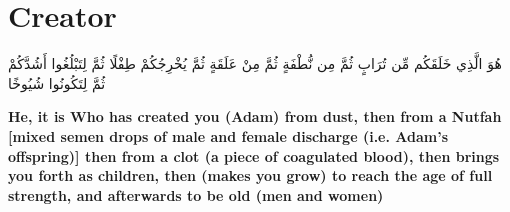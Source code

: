 \chapter{Creator}
\begin{center}
    {\Huge    
        \begin{Arabic}
            هُوَ الَّذِي خَلَقَكُم مِّن تُرَابٍ ثُمَّ مِن نُّطْفَةٍ ثُمَّ مِنْ عَلَقَةٍ ثُمَّ يُخْرِجُكُمْ طِفْلًا ثُمَّ لِتَبْلُغُوا أَشُدَّكُمْ ثُمَّ لِتَكُونُوا شُيُوخًا
        \end{Arabic}
    }
\end{center}
\vspace*{\fill}
\vspace{3cm}
\begin{center}
    \large \textbf{He, it is Who has created you (Adam) from dust, then from a Nutfah [mixed semen drops of male and female discharge (i.e. Adam's offspring)] then from a clot (a piece of coagulated blood), then brings you forth as children, then (makes you grow) to reach the age of full strength, and afterwards to be old (men and women)}
\end{center}
